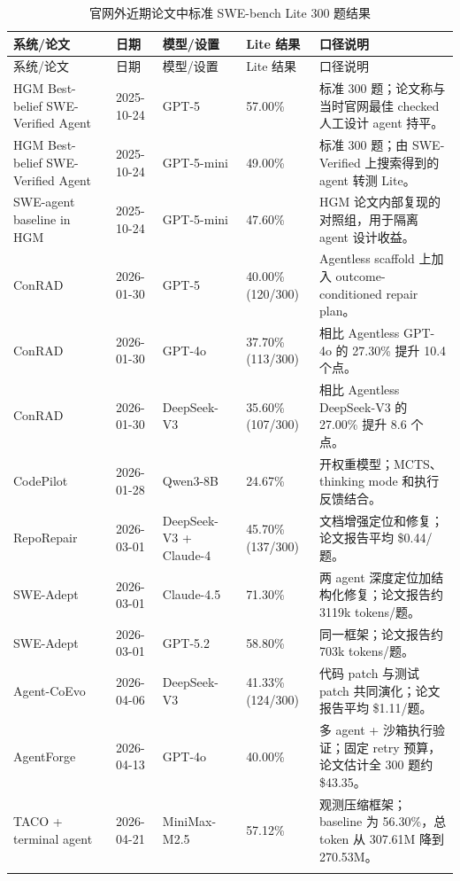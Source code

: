 \documentclass[UTF8,a4paper,11pt]{ctexart}
\begin{document}
\begin{center}
{\scriptsize
\setlength{\tabcolsep}{2.5pt}
\begin{longtable}{L{4.25cm} C{1.55cm} L{2.65cm} C{1.75cm} L{5.05cm}}
\toprule
系统/论文 & 日期 & 模型/设置 & Lite 结果 & 口径说明 \\
\midrule
\endfirsthead
\toprule
系统/论文 & 日期 & 模型/设置 & Lite 结果 & 口径说明 \\
\midrule
\endhead
HGM Best-belief SWE-Verified Agent & 2025-10-24 & GPT-5 & 57.00\% & 标准 300 题；论文称与当时官网最佳 checked 人工设计 agent 持平。 \\
HGM Best-belief SWE-Verified Agent & 2025-10-24 & GPT-5-mini & 49.00\% & 标准 300 题；由 SWE-Verified 上搜索得到的 agent 转测 Lite。 \\
SWE-agent baseline in HGM & 2025-10-24 & GPT-5-mini & 47.60\% & HGM 论文内部复现的对照组，用于隔离 agent 设计收益。 \\
ConRAD & 2026-01-30 & GPT-5 & 40.00\% (120/300) & Agentless scaffold 上加入 outcome-conditioned repair plan。 \\
ConRAD & 2026-01-30 & GPT-4o & 37.70\% (113/300) & 相比 Agentless GPT-4o 的 27.30\% 提升 10.4 个点。 \\
ConRAD & 2026-01-30 & DeepSeek-V3 & 35.60\% (107/300) & 相比 Agentless DeepSeek-V3 的 27.00\% 提升 8.6 个点。 \\
CodePilot & 2026-01-28 & Qwen3-8B & 24.67\% & 开权重模型；MCTS、thinking mode 和执行反馈结合。 \\
RepoRepair & 2026-03-01 & DeepSeek-V3 + Claude-4 & 45.70\% (137/300) & 文档增强定位和修复；论文报告平均 \$0.44/题。 \\
SWE-Adept & 2026-03-01 & Claude-4.5 & 71.30\% & 两 agent 深度定位加结构化修复；论文报告约 3119k tokens/题。 \\
SWE-Adept & 2026-03-01 & GPT-5.2 & 58.80\% & 同一框架；论文报告约 703k tokens/题。 \\
Agent-CoEvo & 2026-04-06 & DeepSeek-V3 & 41.33\% (124/300) & 代码 patch 与测试 patch 共同演化；论文报告平均 \$1.11/题。 \\
AgentForge & 2026-04-13 & GPT-4o & 40.00\% & 多 agent + 沙箱执行验证；固定 retry 预算，论文估计全 300 题约 \$43.35。 \\
TACO + terminal agent & 2026-04-21 & MiniMax-M2.5 & 57.12\% & 观测压缩框架；baseline 为 56.30\%，总 token 从 307.61M 降到 270.53M。 \\
\bottomrule
\caption{官网外近期论文中标准 SWE-bench Lite 300 题结果}
\end{longtable}
}
\end{center}
\end{document}
